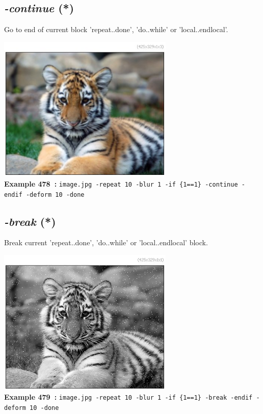 \documentclass[a4paper,11pt,twoside]{book}
\begin{document}
\subsection{\emph{-continue} (*)}\vspace*{-0.5em}
Go to end of current block 'repeat..done', 'do..while' or 'local..endlocal'.
\begin{center}\includegraphics[keepaspectratio=true,height=7cm,width=\textwidth]{img/gmic_def478.jpg}\\
{\footnotesize \textbf{Example 478~:} \texttt{image.jpg -repeat 10 -blur 1 -if \{1==1\} -continue -endif -deform 10 -done}}
\end{center}

\subsection{\emph{-break} (*)}\vspace*{-0.5em}
Break current 'repeat..done', 'do..while' or 'local..endlocal' block.
\begin{center}\includegraphics[keepaspectratio=true,height=7cm,width=\textwidth]{img/gmic_def479.jpg}\\
{\footnotesize \textbf{Example 479~:} \texttt{image.jpg -repeat 10 -blur 1 -if \{1==1\} -break -endif -deform 10 -done}}
\end{center}
\end{document}
